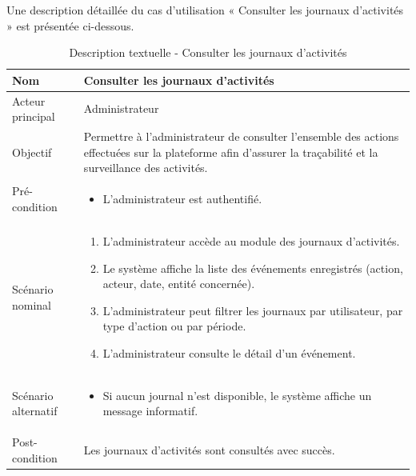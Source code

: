 Une description détaillée du cas d'utilisation « Consulter les journaux d'activités » est présentée ci-dessous.

\begin{table}[H]
\centering
\begin{tabular}{ |p{4cm}|p{12cm}|} \hline

Nom & Consulter les journaux d'activités \\ \hline

Acteur principal & Administrateur \\ \hline

Objectif & Permettre à l'administrateur de consulter l'ensemble des actions effectuées sur la plateforme afin d'assurer la traçabilité et la surveillance des activités. \\ \hline

Pré-condition &
\begin{itemize}
    \item L'administrateur est authentifié.
\end{itemize}
\\ \hline

Scénario nominal &
\begin{enumerate}
    \item L'administrateur accède au module des journaux d'activités.
    \item Le système affiche la liste des événements enregistrés (action, acteur, date, entité concernée).
    \item L'administrateur peut filtrer les journaux par utilisateur, par type d'action ou par période.
    \item L'administrateur consulte le détail d'un événement.
\end{enumerate}
\\ \hline

Scénario alternatif &
\begin{itemize}
    \item Si aucun journal n'est disponible, le système affiche un message informatif.
\end{itemize}
\\ \hline

Post-condition &
Les journaux d'activités sont consultés avec succès. \\ \hline

\end{tabular}
\caption{Description textuelle - Consulter les journaux d'activités}
\label{tab:journaux-activites}
\end{table}


